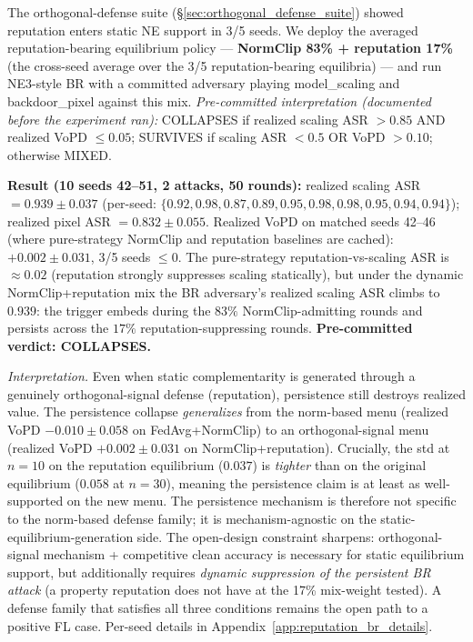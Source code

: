\documentclass{article}
\begin{document}
The orthogonal-defense suite (§\ref{sec:orthogonal_defense_suite}) showed reputation enters static NE support in 3/5 seeds. We deploy the averaged reputation-bearing equilibrium policy --- \textbf{NormClip 83\% + reputation 17\%} (the cross-seed average over the 3/5 reputation-bearing equilibria) --- and run NE3-style BR with a committed adversary playing model\_scaling and backdoor\_pixel against this mix. \emph{Pre-committed interpretation (documented before the experiment ran):} COLLAPSES if realized scaling ASR $>0.85$ AND realized VoPD $\leq 0.05$; SURVIVES if scaling ASR $<0.5$ OR VoPD $>0.10$; otherwise MIXED.

\textbf{Result (10 seeds 42--51, 2 attacks, 50 rounds):} realized scaling ASR $= \mathbf{0.939 \pm 0.037}$ (per-seed: $\{0.92, 0.98, 0.87, 0.89, 0.95, 0.98, 0.98, 0.95, 0.94, 0.94\}$); realized pixel ASR $= 0.832 \pm 0.055$. Realized VoPD on matched seeds 42--46 (where pure-strategy NormClip and reputation baselines are cached): $\mathbf{+0.002 \pm 0.031}$, 3/5 seeds $\leq 0$. The pure-strategy reputation-vs-scaling ASR is $\approx 0.02$ (reputation strongly suppresses scaling statically), but under the dynamic NormClip+reputation mix the BR adversary's realized scaling ASR climbs to $0.939$: the trigger embeds during the $83\%$ NormClip-admitting rounds and persists across the $17\%$ reputation-suppressing rounds. \textbf{Pre-committed verdict: COLLAPSES.}

\emph{Interpretation.} Even when static complementarity is generated through a genuinely orthogonal-signal defense (reputation), persistence still destroys realized value. The persistence collapse \emph{generalizes} from the norm-based menu (realized VoPD $-0.010 \pm 0.058$ on FedAvg+NormClip) to an orthogonal-signal menu (realized VoPD $+0.002 \pm 0.031$ on NormClip+reputation). Crucially, the std at $n{=}10$ on the reputation equilibrium ($0.037$) is \emph{tighter} than on the original equilibrium ($0.058$ at $n{=}30$), meaning the persistence claim is at least as well-supported on the new menu. The persistence mechanism is therefore not specific to the norm-based defense family; it is mechanism-agnostic on the static-equilibrium-generation side. The open-design constraint sharpens: orthogonal-signal mechanism + competitive clean accuracy is necessary for static equilibrium support, but additionally requires \emph{dynamic suppression of the persistent BR attack} (a property reputation does not have at the 17\% mix-weight tested). A defense family that satisfies all three conditions remains the open path to a positive FL case. Per-seed details in Appendix~\ref{app:reputation_br_details}.
\end{document}
